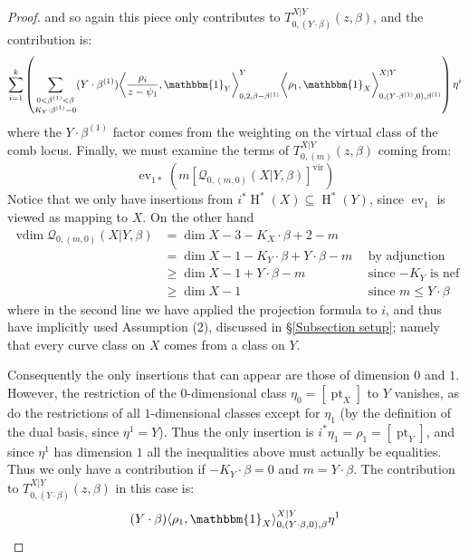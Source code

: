 \documentclass[11pt]{amsart}
\newcommand{\Q}[4]{\mathcal{Q}_{#1,#2}(#3,#4)}
\newcommand{\virt}[1]{[#1]^{\operatorname{vir}}}
\newcommand{\HH}{\operatorname{H}}
\newcommand{\pt}{\operatorname{pt}}
\newcommand{\ev}{\operatorname{ev}}
\newcommand{\vdim}{\operatorname{vdim}}
\theoremstyle{definition}
\theoremstyle{definition}
\begin{document}
\begin{proof}
and so again this piece only contributes to $T_{0,(Y\cdot\beta)}^{X|Y}(z,\beta)$, and the contribution is:
\begin{equation*} \sum_{i=1}^k \left( \sum_{\substack{0 < \beta^{(1)} < \beta \\ K_Y \cdot \beta^{(1)}=0}} (Y \cdot \beta^{(1)}) \bigg\langle \dfrac{\rho_i}{z-\psi_1}, \mathbbm{1}_Y \bigg\rangle_{0,2,\beta-\beta^{(1)}}^Y \bigg\langle \rho_1, \mathbbm{1}_X \bigg\rangle_{0,(Y \cdot \beta^{(1)},0),\beta^{(1)}}^{X|Y} \right) \eta^i \end{equation*}
where the $Y \cdot \beta^{(1)}$ factor comes from the weighting on the virtual class of the comb locus. Finally, we must examine the terms of $T_{0,(m)}^{X|Y}(z,\beta)$ coming from:
\begin{equation*}\ev_{1*}(m\virt{\Q{0}{(m,0)}{X|Y}{\beta}})\end{equation*} 
Notice that we only have insertions from $i^*\HH^*(X) \subseteq \HH^*(Y)$, since $\ev_1$ is viewed as mapping to $X$. On the other hand
\begin{align*} \vdim \Q{0}{(m,0)}{X|Y}{\beta} & = \dim X-3 -K_X \cdot \beta +2-m & \\
& = \dim X - 1 -K_Y \cdot \beta + Y \cdot \beta - m \ \ & \text{by adjunction} \\
& \geq \dim X - 1 + Y\cdot\beta - m \ \ & \text{since $-K_Y$ is nef} \\
& \geq \dim X - 1 \ \ & \text{since $m \leq Y \cdot \beta$} \end{align*}
where in the second line we have applied the projection formula to $i$, and thus have implicitly used Assumption (2), discussed in \S \ref{Subsection setup}; namely that every curve class on $X$ comes from a class on $Y$.

Consequently the only insertions that can appear are those of dimension $0$ and $1$. However, the restriction of the $0$-dimensional class $\eta_0 = [\pt_X]$ to $Y$ vanishes, as do the restrictions of all $1$-dimensional classes except for $\eta_1$ (by the definition of the dual basis, since $\eta^1 = Y$). Thus the only insertion is $i^*\eta_1=\rho_1=[\pt_Y]$, and since $\eta^1$ has dimension $1$ all the inequalities above must actually be equalities. Thus we only have a contribution if $-K_Y \cdot \beta = 0$ and $m = Y \cdot \beta$. The contribution to $T_{0,(Y\cdot\beta)}^{X|Y}(z,\beta)$ in this case is:
\begin{equation*} (Y \cdot \beta) \langle \rho_1 , \mathbbm{1}_X \rangle_{0,(Y \cdot \beta,0),\beta}^{X|Y} \eta^1 \end{equation*}


\end{proof}
\end{document}
